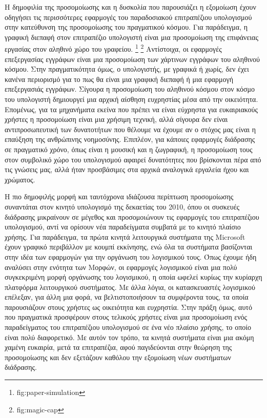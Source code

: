 \documentclass[
]{article}
\begin{document}
Η δημοφιλία της προσομοίωσης και η δυσκολία που παρουσιάζει η εξομοίωση
έχουν οδηγήσει τις περισσότερες εφαρμογές του παραδοσιακού επιτραπέζιου
υπολογισμού στην κατεύθυνση της προσομοίωσης του πραγματικού κόσμου. Για
παράδειγμα, η γραφική διεπαφή στον επιτραπέζιο υπολογιστή είναι μια
προσομοίωση της επιφάνειας εργασίας στον αληθινό χώρο του γραφείου.
\footnote{fig:paper-simulation} \footnote{fig:magic-cap} Αντίστοιχα, οι
εφαρμογές επεξεργασίας εγγράφων είναι μια προσομοίωση των χάρτινων
εγγράφων του αληθινού κόσμου. Στην πραγματικότητα όμως, ο υπολογιστής,
με γραφικά ή χωρίς, δεν έχει κανένα περιορισμό για το πως θα είναι μια
γραφική διεπαφή ή μια εφαρμογή επεξεργασιάς εγγράφων. Σίγουρα η
προσομοίωση του αληθινού κόσμου στον κόσμο του υπολογιστή δημιουργεί μια
αρχική αίσθηση ευχρηστίας μέσα από την οικειότητα. Επομένως, για τα
μηχανήματα εκείνα που πρέπει να είναι εύχρηστα για ευκαιριακούς χρήστες
η προσομοίωση είναι μια χρήσιμη τεχνική, αλλά σίγουρα δεν είναι
αντιπροσωπευτική των δυνατοτήτων που θέλουμε να έχουμε αν ο στόχος μας
είναι η επαύξηση της ανθρώπινης νοημοσύνης. Επιπλέον, για κάποιες
εφαρμογές διάδρασης σε πραγματικό χρόνο, όπως είναι η μουσική και η
ζωγραφική, η προσομοίωση τους στον συμβολικό χώρο του υπολογισμού
αφαιρεί δυνατότητες που βρίσκονται πέρα από τις γνώσεις μας, αλλά ήταν
προσβάσιμες στα αρχικά αναλογικά εργαλεία ήχου και χρώματος.

Η πιο δημοφιλής μορφή και ταυτόχρονα ιδιάζουσα περίπτωση προσομοίωσης
συναντάται στον κινητό υπολογισμό της δεκαετίας του 2010, όπου οι
συσκευές διάδρασης μικραίνουν σε μέγεθος και προσομοιώνουν τις εφαρμογές
του επιτραπέζιου υπολογισμού, αντί να ορίσουν νέα παραδείγματα συμβατά
με το κινητό πλαίσιο χρήσης. Για παράδειγμα, τα πρώτα κινητά λειτουργικά
συστήματα της Microsoft έχουν γραφικό περιβάλλον με κουμπί εκκίνησης,
ενώ όλα τα συστήματα βασίζονται στην ιδέα των εφαρμογών για την οργάνωση
του λογισμικού τους. Όπως έχουμε ήδη αναλύσει στην ενότητα των Μορφών,
οι εφαρμογές λογισμικού είναι μια πολύ συγκεκριμένη μορφή οργάνωσης του
λογισμικού, η οποία ωφελεί κυρίως την κυρίαρχη πλατφόρμα λειτουργικού
συστήματος. Με άλλα λόγια, οι κατασκευαστές λογισμικού επέλεξαν, για
άλλη μια φορά, να βελτιστοποιήσουν τα συμφέροντα τους, τα οποία
παρουσιάζουν στους χρήστες ως οικειότητα και ευχρηστία. Στην πράξη όμως,
αυτό που πραγματικά προσφέρουν στους τελικούς χρήστες είναι μια
προσομοίωση ενός παραδείγματος του επιτραπέζιου υπολογισμού σε ένα νέο
πλαίσιο χρήσης, το οποίο είναι πολύ διαφορετικό. Με αυτόν τον τρόπο, τα
κινητά συστήματα είναι μια ακόμη χαμένη ευκαιρία, μετά τα επιτραπέζια,
αφού παγιδεύονται στην θεώρηση της προσομοίωσης και δεν εξετάζουν
καθόλου την εξομοίωση νέων συστήματων διάδρασης.
\end{document}

